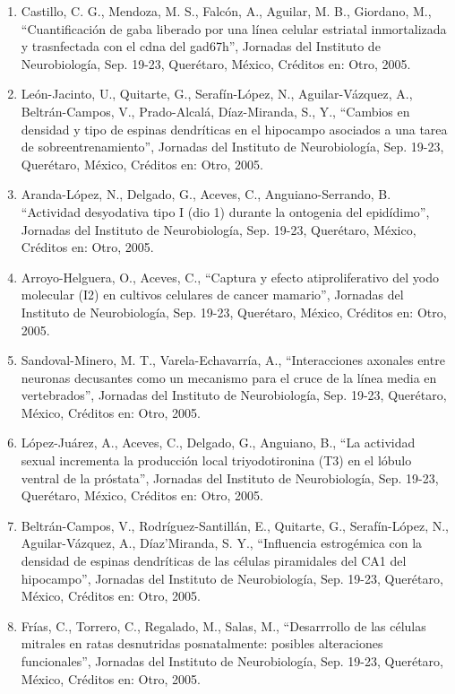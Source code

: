 \documentclass[12pt]{article}
\begin{document}
\begin{enumerate}
\item Castillo, C. G., Mendoza, M. S., Falcón, A., Aguilar, M. B., Giordano, M., “Cuantificación de gaba liberado por una línea celular 
estriatal inmortalizada y trasnfectada con el cdna del gad67h”, Jornadas del Instituto de Neurobiología, Sep. 19-23, Querétaro, México, 
Créditos en: Otro, 2005.

\item León-Jacinto, U., Quitarte, G., Serafín-López, N., Aguilar-Vázquez, A., Beltrán-Campos, V., Prado-Alcalá, Díaz-Miranda, S., Y., 
“Cambios en densidad y tipo de espinas dendríticas en el hipocampo asociados a una tarea de sobreentrenamiento”, Jornadas del Instituto 
de Neurobiología, Sep. 19-23, Querétaro, México, Créditos en: Otro, 2005.

\item Aranda-López, N., Delgado, G., Aceves, C., Anguiano-Serrando, B. “Actividad desyodativa tipo I (dio 1) durante la ontogenia del 
epidídimo”, Jornadas del Instituto de Neurobiología, Sep. 19-23, Querétaro, México, Créditos en: Otro, 2005.

\item Arroyo-Helguera, O., Aceves, C., “Captura y efecto atiproliferativo del yodo molecular (I2) en cultivos celulares de cancer 
mamario”, Jornadas del Instituto de Neurobiología, Sep. 19-23, Querétaro, México, Créditos en: Otro, 2005.

\item Sandoval-Minero, M. T., Varela-Echavarría, A., “Interacciones axonales entre neuronas decusantes como un mecanismo para el cruce 
de 
la línea media en vertebrados”, Jornadas del Instituto de Neurobiología, Sep. 19-23, Querétaro, México, Créditos en: Otro, 2005.

\item López-Juárez, A., Aceves, C., Delgado, G., Anguiano, B., “La actividad sexual incrementa la producción local triyodotironina (T3) 
en el lóbulo ventral de la próstata”, Jornadas del Instituto de Neurobiología, Sep. 19-23, Querétaro, México, Créditos en: Otro, 2005.

\item Beltrán-Campos, V., Rodríguez-Santillán, E., Quitarte, G., Serafín-López, N., Aguilar-Vázquez, A., Díaz’Miranda, S. 
Y., “Influencia estrogémica con la densidad de espinas dendríticas de las células piramidales del CA1 del hipocampo”, Jornadas del 
Instituto de Neurobiología, Sep. 19-23, Querétaro, México, Créditos en: Otro, 2005.

\item Frías, C., Torrero, C., Regalado, M., Salas, M., “Desarrrollo de las células mitrales en ratas desnutridas posnatalmente: 
posibles 
alteraciones funcionales”, Jornadas del Instituto de Neurobiología, Sep. 19-23, Querétaro, México, Créditos en: Otro, 2005.


\end{enumerate}
\end{document}
